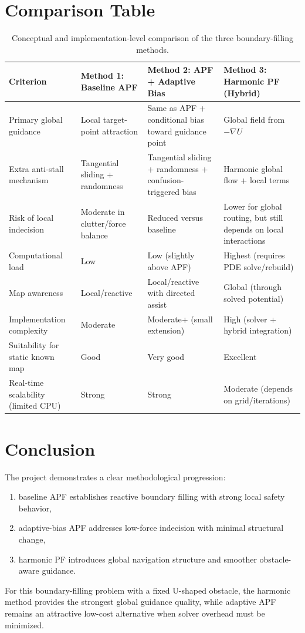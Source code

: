 \documentclass[11pt,a4paper]{article}
\begin{document}
\section{Comparison Table}
\begin{table}[H]
\centering
\small
\begin{tabular}{p{} p{} p{} p{}}
\toprule
\textbf{Criterion} & \textbf{Method 1: Baseline APF} & \textbf{Method 2: APF + Adaptive Bias} & \textbf{Method 3: Harmonic PF (Hybrid)} \\
\midrule
Primary global guidance & Local target-point attraction & Same as APF + conditional bias toward guidance point & Global field from $-\nabla U$ \\
Extra anti-stall mechanism & Tangential sliding + randomness & Tangential sliding + randomness + confusion-triggered bias & Harmonic global flow + local terms \\
Risk of local indecision & Moderate in clutter/force balance & Reduced versus baseline & Lower for global routing, but still depends on local interactions \\
Computational load & Low & Low (slightly above APF) & Highest (requires PDE solve/rebuild) \\
Map awareness & Local/reactive & Local/reactive with directed assist & Global (through solved potential) \\
Implementation complexity & Moderate & Moderate+ (small extension) & High (solver + hybrid integration) \\
Suitability for static known map & Good & Very good & Excellent \\
Real-time scalability (limited CPU) & Strong & Strong & Moderate (depends on grid/iterations) \\
\bottomrule
\end{tabular}
\caption{Conceptual and implementation-level comparison of the three boundary-filling methods.}
\end{table}

\section{Conclusion}
The project demonstrates a clear methodological progression:
\begin{enumerate}[leftmargin=1.2em]
    \item baseline APF establishes reactive boundary filling with strong local safety behavior,
    \item adaptive-bias APF addresses low-force indecision with minimal structural change,
    \item harmonic PF introduces global navigation structure and smoother obstacle-aware guidance.
\end{enumerate}
For this boundary-filling problem with a fixed U-shaped obstacle, the harmonic method provides the strongest global guidance quality, while adaptive APF remains an attractive low-cost alternative when solver overhead must be minimized.
\end{document}
